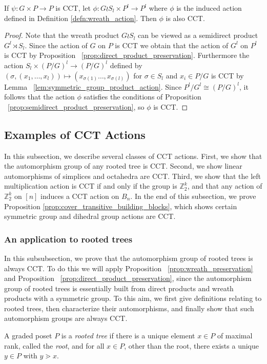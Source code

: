 \documentclass[smallextended, envcountsame, numbook]{svjour3}
\numberwithin{equation}{section}
\newcommand\ssec{\subsection}
\newcommand\sssec{\subsubsection}
\begin{document}
\begin{proposition}
\label{prop:wreath_preservation}
If $\psi\colon G\times P \rightarrow P$ is CCT, let $\phi\colon G\wr S_l \times P^l \rightarrow P^l$ where $\phi$ is the induced action defined in Definition \ref{defn:wreath_action}. Then $\phi$ is also CCT.
\end{proposition}
\begin{proof}
Note that the wreath product $G \wr S_l$ can be viewed as a semidirect product $G^l \rtimes S_l$. Since the action of $G$ on $P$ is CCT we obtain that the action of $G^l$ on $P^l$ is CCT by Proposition ~\ref{prop:direct_product_preservation}.  Furthermore the action $S_l \times (P/G)^l \rightarrow (P/G)^l$ defined by $(\sigma ,(x_1,\ldots, x_l)) \mapsto (x_{\sigma(1)}\ldots, x_{\sigma(l)})$ for $\sigma \in S_l$ and $x_i \in P/G$ is CCT by Lemma ~\ref{lem:symmetric_group_product_action}.  Since $P^l/G^l \cong (P/G)^l$, it follows that the action $\phi$ satisfies the conditions of Proposition ~\ref{prop:semidirect_product_preservation}, so $\phi$ is CCT.
\end{proof}



\ssec{Examples of CCT Actions}\label{ssec:CCT_examples}

In this subsection, we describe several classes of CCT actions. First, we show that the automorphism group of any rooted tree is CCT. Second, we show linear automorphisms of simplices and octahedra are CCT. Third, we show that the left multiplication action is CCT if and only if the group is $\mathbb Z_2^k$, and that any action of $\mathbb Z_2^k$ on $[n]$ induces a CCT action on $B_n$. In the end of this subsection, we prove Proposition \ref{prop:cover_transitive_building_blocks}, which shows certain symmetric group and dihedral group actions are CCT.

\sssec{An application to rooted trees}
\label{ssec:rooted_trees}
In this subsubsection, we prove that the automorphism group of rooted trees is always CCT. To do this we will apply Proposition ~\ref{prop:wreath_preservation} and Proposition ~\ref{prop:direct_product_preservation}, since the automorphism group of rooted trees is essentially built from direct products and wreath products with a symmetric group. To this aim, we first give definitions relating to rooted trees, then characterize their automorphisms, and finally show that such automorphism groups are always CCT.

\begin{definition}
A graded poset $P$ is a {\it rooted tree} if there is a unique element $x \in P$ of maximal rank, called the {\it root}, and for all $x \in P$, other than the root, there exists a unique $y \in P$ with $y \gtrdot x$.
\end{definition}
\end{document}
